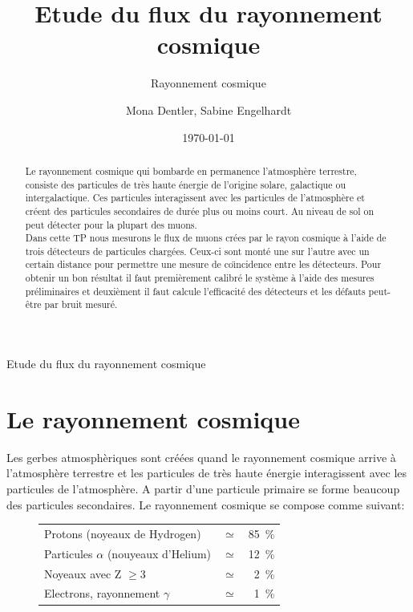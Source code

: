 \documentclass[a4paper,11pt,liststotocnumbered,bibtotocnumbered]{scrartcl}
\title{Etude du flux du rayonnement cosmique}
\subtitle{Rayonnement cosmique}
\author{Mona Dentler, Sabine Engelhardt}
\date{\today}
\begin{document}
 \nocite{poly}
 \pagestyle{empty}
 \begin{center}
  \makeatletter
  \@subject
  \vspace{2cm}

  \Huge
  Etude du flux du rayonnement cosmique\newline
  \vspace{1cm}
  \Large


  \@author
  \newline
  \@publishers


  \@date
  \makeatother
 \end{center}
 \vfill
 
 \nocite{poly}

 \begin{abstract}
  Le rayonnement cosmique qui bombarde en permanence l'atmosphère terrestre, consiste des particules de très haute énergie de l'origine solare, galactique ou intergalactique. Ces particules interagissent avec les particules de l'atmosphère et créent des particules secondaires de durée plus ou moins court. Au niveau de sol on peut détecter pour la plupart des muons.\\
  Dans cette TP nous mesurons le flux de muons crées par le rayon cosmique à l'aide de trois détecteurs de particules chargées. Ceux-ci sont monté une sur l'autre avec un certain distance pour permettre une mesure de co\"{\i}ncidence entre les détecteurs. Pour obtenir un bon résultat il faut premièrement calibré le système à l'aide des mesures préliminaires et deuxièment il faut calcule l'efficacité des détecteurs et les défauts peut-être par bruit mesuré.
 \end{abstract}
\newpage
 \pagestyle{scrheadings}
 \tableofcontents
\newpage

 \section{Le rayonnement cosmique}
  Les gerbes atmosphèriques sont créées quand le rayonnement cosmique arrive à l'atmosphère terrestre et les particules de très haute énergie interagissent avec les particules de l'atmosphère. A partir d'une particule primaire se forme beaucoup des particules secondaires. Le rayonnement cosmique se compose comme suivant:
   \begin{figure}[htb]
    \centering
    \begin{tabular}{lcr}
     Protons (noyeaux de Hydrogen) & $\simeq$ & 85~\%\\
     Particules $\alpha$ (nouyeaux d'Helium) & $\simeq$ & 12~\%\\
     Noyeaux avec Z $\geq 3$	& $\simeq$ & 2~\%\\ 
     Electrons, rayonnement $\gamma$	& $\simeq$ & 1~\%\\
    \end{tabular}\cite[S. 14]{burak}
   \end{figure}	
\end{document}
